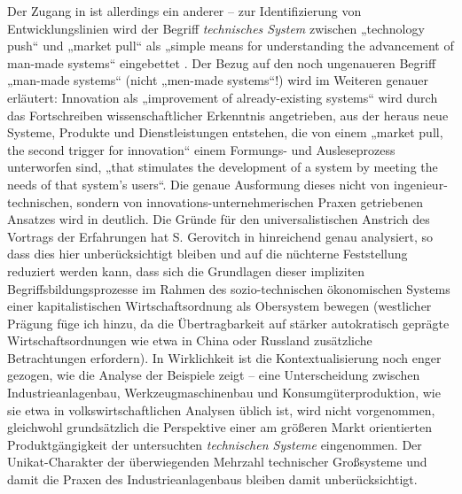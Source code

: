 \documentclass[11pt,a4paper]{article}
\begin{document}
Der Zugang in \cite{TESE2018} ist allerdings ein anderer -- zur
Identifizierung von Entwicklungslinien wird der Begriff \emph{technisches
  System} zwischen „technology push“ und „market pull“ als „simple means for
understanding the advancement of man-made systems“ eingebettet
\cite[S. 1]{TESE2018}. Der Bezug auf den noch ungenaueren Begriff „man-made
systems“ (nicht „men-made systems“!) wird im Weiteren genauer erläutert:
Innovation als „improvement of already-existing systems“ wird durch das
Fortschreiben wissenschaftlicher Erkenntnis angetrieben, aus der heraus neue
Systeme, Produkte und Dienstleistungen entstehen, die von einem „market pull,
the second trigger for innovation“ einem Formungs- und Ausleseprozess
unterworfen sind, „that stimulates the development of a system by meeting the
needs of that system's users“.  Die genaue Ausformung dieses nicht von
ingenieur-technischen, sondern von innovations-unternehmerischen Praxen
getriebenen Ansatzes wird in \cite[Kap. 3]{TESE2018} deutlich.  Die Gründe für
den universalistischen Anstrich des Vortrags der Erfahrungen hat S. Gerovitch
in \cite{Gerovitch1996} hinreichend genau analysiert, so dass dies hier
unberücksichtigt bleiben und auf die nüchterne Feststellung reduziert werden
kann, dass sich die Grundlagen dieser impliziten Begriffsbildungsprozesse im
Rahmen des sozio-technischen ökonomischen Systems einer kapitalistischen
Wirtschaftsordnung als Obersystem bewegen (westlicher Prägung füge ich hinzu,
da die Übertragbarkeit auf stärker autokratisch geprägte Wirtschaftsordnungen
wie etwa in China oder Russland zusätzliche Betrachtungen erfordern).  In
Wirklichkeit ist die Kontextualisierung noch enger gezogen, wie die Analyse
der Beispiele zeigt -- eine Unterscheidung zwischen Industrieanlagenbau,
Werkzeugmaschinenbau und Konsumgüterproduktion, wie sie etwa in
volkswirtschaftlichen Analysen üblich ist, wird nicht vorgenommen, gleichwohl
grundsätzlich die Perspektive einer am größeren Markt orientierten
Produktgängigkeit der untersuchten \emph{technischen Systeme} eingenommen.
Der Unikat-Charakter der überwiegenden Mehrzahl technischer Großsysteme und
damit die Praxen des Industrieanlagenbaus bleiben damit unberücksichtigt.
\end{document}
